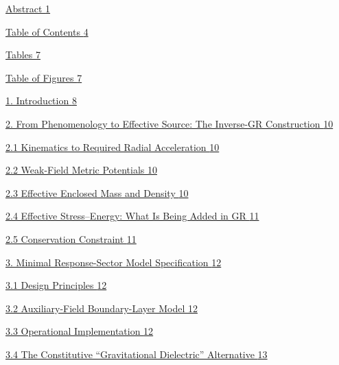 \documentclass[11pt]{article}
\begin{document}
\clearpage
\tableofcontents
\listoftables
\listoffigures
\clearpage
\iffalse %
\hyperref[abstract]{Abstract \hyperref[abstract]{1}}

\hyperref[table-of-contents]{Table of Contents \hyperref[table-of-contents]{4}}

\hyperref[tables]{Tables \hyperref[tables]{7}}

\hyperref[table-of-figures]{Table of Figures \hyperref[table-of-figures]{7}}

\hyperref[introduction]{1. Introduction \hyperref[introduction]{8}}

\hyperref[from-phenomenology-to-effective-source-the-inverse-gr-construction]{2. From Phenomenology to Effective Source: The Inverse-GR Construction \hyperref[from-phenomenology-to-effective-source-the-inverse-gr-construction]{10}}

\hyperref[kinematics-to-required-radial-acceleration]{2.1 Kinematics to Required Radial Acceleration \hyperref[kinematics-to-required-radial-acceleration]{10}}

\hyperref[weak-field-metric-potentials]{2.2 Weak-Field Metric Potentials \hyperref[weak-field-metric-potentials]{10}}

\hyperref[effective-enclosed-mass-and-density]{2.3 Effective Enclosed Mass and Density \hyperref[effective-enclosed-mass-and-density]{10}}

\hyperref[effective-stressenergy-what-is-being-added-in-gr]{2.4 Effective Stress--Energy: What Is Being Added in GR \hyperref[effective-stress-energy-what-is-being-added-in-gr]{11}}

\hyperref[conservation-constraint]{2.5 Conservation Constraint \hyperref[conservation-constraint]{11}}

\hyperref[minimal-response-sector-model-specification]{3. Minimal Response-Sector Model Specification \hyperref[minimal-response-sector-model-specification]{12}}

\hyperref[design-principles]{3.1 Design Principles \hyperref[design-principles]{12}}

\hyperref[auxiliary-field-boundary-layer-model]{3.2 Auxiliary-Field Boundary-Layer Model \hyperref[auxiliary-field-boundary-layer-model]{12}}

\hyperref[operational-implementation]{3.3 Operational Implementation \hyperref[operational-implementation]{12}}

\hyperref[the-constitutive-gravitational-dielectric-alternative]{3.4 The Constitutive ``Gravitational Dielectric'' Alternative \hyperref[the-constitutive-gravitational-dielectric-alternative]{13}}
\end{document}
